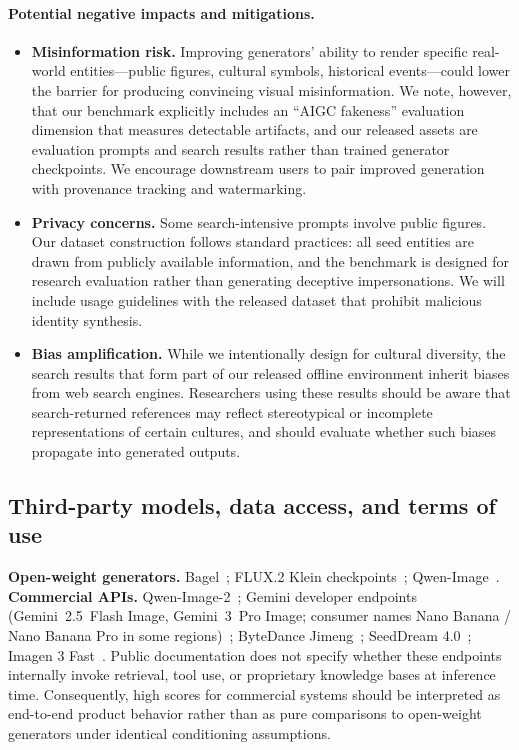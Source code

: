 \paragraph{Potential negative impacts and mitigations.}
\begin{itemize}
  \item \textbf{Misinformation risk.}
  Improving generators' ability to render specific real-world entities---public figures, cultural symbols, historical events---could lower the barrier for producing convincing visual misinformation.
  We note, however, that our benchmark explicitly includes an ``AIGC fakeness'' evaluation dimension that measures detectable artifacts, and our released assets are evaluation prompts and search results rather than trained generator checkpoints.
  We encourage downstream users to pair improved generation with provenance tracking and watermarking.

  \item \textbf{Privacy concerns.}
  Some search-intensive prompts involve public figures.
  Our dataset construction follows standard practices: all seed entities are drawn from publicly available information, and the benchmark is designed for research evaluation rather than generating deceptive impersonations.
  We will include usage guidelines with the released dataset that prohibit malicious identity synthesis.

  \item \textbf{Bias amplification.}
  While we intentionally design for cultural diversity, the search results that form part of our released offline environment inherit biases from web search engines.
  Researchers using these results should be aware that search-returned references may reflect stereotypical or incomplete representations of certain cultures, and should evaluate whether such biases propagate into generated outputs.
  {\color{white}\nocite{wang2025code,wang2025emergent,wang2025pixelreasoner,wang2025vl,wang2025reverse,wang2026badseeingbadthinking}}
\end{itemize}


\subsection{Third-party models, data access, and terms of use}
\label{app:third_party}
\textbf{Open-weight generators.}
Bagel~\cite{deng2025bagel}; FLUX.2 Klein checkpoints~\cite{blackforest2026flux2}; Qwen-Image~\cite{qwenimage}.
\textbf{Commercial APIs.}
Qwen-Image-2~\cite{qwenimage}; Gemini developer endpoints (Gemini~2.5~Flash Image, Gemini~3~Pro Image; consumer names Nano Banana / Nano Banana Pro in some regions)~\cite{nanobanana2025gemini}; ByteDance Jimeng~\cite{jimeng2025bytedance}; SeedDream 4.0~\cite{seedream2025arxiv}; Imagen 3 Fast~\cite{baldridge2024imagen3}.
Public documentation does not specify whether these endpoints internally invoke retrieval, tool use, or proprietary knowledge bases at inference time.
Consequently, high \bench{} scores for commercial systems should be interpreted as end-to-end product behavior rather than as pure comparisons to open-weight generators under identical conditioning assumptions.

